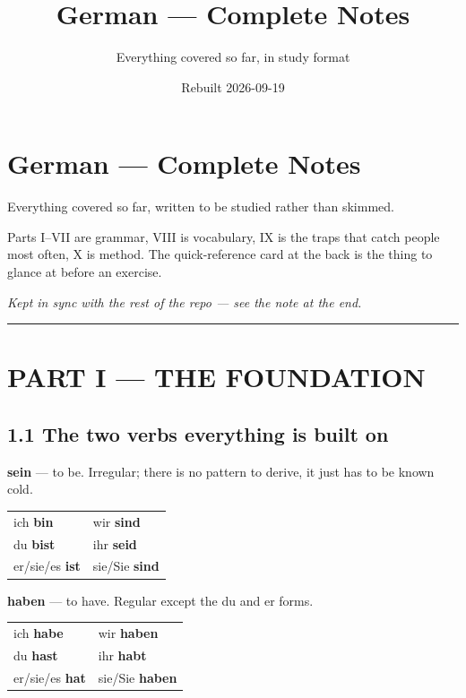 \documentclass[
  11pt,
]{article}
\title{German --- Complete Notes}
\subtitle{Everything covered so far, in study format}
\author{}
\date{Rebuilt 2026-09-19}
\newcounter{none} %
\begin{document}
\maketitle

{
\hypersetup{linkcolor=headingblue}
\setcounter{tocdepth}{2}
\tableofcontents
}
\section{German --- Complete Notes}\label{german-complete-notes}

Everything covered so far, written to be studied rather than skimmed.

Parts I--VII are grammar, VIII is vocabulary, IX is the traps that catch
people most often, X is method. The quick-reference card at the back is
the thing to glance at before an exercise.

\emph{Kept in sync with the rest of the repo --- see the note at the
end.}

\begin{center}\rule{0.5\linewidth}{0.5pt}\end{center}

\section{PART I --- THE FOUNDATION}\label{part-i-the-foundation}

\subsection{1.1 The two verbs everything is built
on}\label{the-two-verbs-everything-is-built-on}

\textbf{sein} --- to be. Irregular; there is no pattern to derive, it
just has to be known cold.

{\def\LTcaptype{none} %
\begin{longtable}[]{@{}ll@{}}
\toprule\noalign{}
\endhead
\bottomrule\noalign{}
\endlastfoot
ich \textbf{bin} & wir \textbf{sind} \\
du \textbf{bist} & ihr \textbf{seid} \\
er/sie/es \textbf{ist} & sie/Sie \textbf{sind} \\
\end{longtable}
}

\textbf{haben} --- to have. Regular except the du and er forms.

{\def\LTcaptype{none} %
\begin{longtable}[]{@{}ll@{}}
\toprule\noalign{}
\endhead
\bottomrule\noalign{}
\endlastfoot
ich \textbf{habe} & wir \textbf{haben} \\
du \textbf{hast} & ihr \textbf{habt} \\
er/sie/es \textbf{hat} & sie/Sie \textbf{haben} \\
\end{longtable}
}
\end{document}
